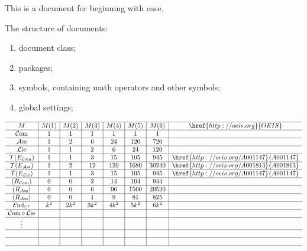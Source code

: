\documentclass{article}
\numberwithin{equation}{section}
\theoremstyle{plain}
\numberwithin{equation}{section}
\theoremstyle{remark}
\DeclareMathOperator{\Com}{\operatorname{\mathcal{C}om}}
\DeclareMathOperator{\Ass}{\operatorname{\mathcal{A}ss}}
\DeclareMathOperator{\Lie}{\operatorname{\mathcal{L}ie}}
\DeclareMathOperator{\calEnd}{\operatorname{\mathcal{E}nd}} %
\begin{document}
This is a document for beginning with ease.


The structure of documents:
\begin{enumerate}
\item document class;
\item packages;
\item symbols, containing math operators and other symbols;
\item global settings;
\end{enumerate}
\renewcommand{\arraystretch}{1.2}

\begin{table}[ht]
\centering
\[
\begin{array}{c|c|c|c|c|c|c|c}
\hline
M                      & M(1) & M(2) & M(3) & M(4) & M(5) & M(6)  & \href{http://oeis.org}{OEIS} \\ \hline
\Com                   & 1    & 1    & 1    & 1    & 1    & 1     &      \\ \hline
\Ass                   & 1    & 2    & 6    & 24   & 120  & 720   &      \\ \hline
\Lie                   & 1    & 1    & 2    & 6    & 24   & 120   &      \\ \hline
\mathcal{T}(E_{\Com})  & 1    & 1    & 3    & 15   & 105  & 945   &  \href{http://oeis.org/A001147}{A001147}    \\ \hline
\mathcal{T}(E_{\Ass})  & 1    & 2    & 12   & 120  & 1680 & 30240 & \href{http://oeis.org/A001813}{A001813}     \\ \hline
\mathcal{T}(E_{\Lie})  & 1    & 1    & 3    & 15   & 105  & 945   & \href{http://oeis.org/A001147}{A001147}     \\ \hline
\left(R_{\Com}\right)  & 0    & 0    & 2    & 14   & 104  & 944   &      \\ \hline
\left(R_{\Ass}\right)  & 0    & 0    & 6    & 96   & 1560 & 29520 &      \\ \hline
\left(R_{\Ass}\right)  & 0    & 0    & 1    & 9    & 81   & 825   &      \\ \hline
\calEnd_{\mathbb{C}^k} & k^2  & 2k^2 & 3k^2 & 4k^2 & 5k^2 & 6k^2  &      \\ \hline
\Com \circ \Lie        &      &      &      &      &      &       &      \\ \hline
\vdots                 &      &      &      &      &      &       &      \\ \hline
                       &      &      &      &      &      &       &      \\ \hline
                       &      &      &      &      &      &       &      \\ \hline
\end{array}
\]
\end{table}
\end{document}
